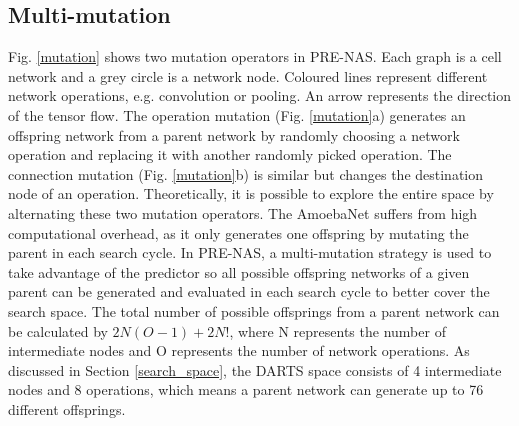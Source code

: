 \documentclass[sigconf]{acmart}
\begin{document}
\subsection{Multi-mutation}
\label{sec-mulmutation}
Fig. \ref{mutation} shows two mutation operators in PRE-NAS. Each graph is a cell network and a grey circle is a network node.  Coloured lines represent different network operations, e.g. convolution or pooling.  An arrow represents the direction of the tensor flow. The operation mutation (Fig. \ref{mutation}a) generates an offspring network from a parent network by randomly choosing a network operation and replacing it with another randomly picked operation.  The connection mutation (Fig. \ref{mutation}b) is similar but changes the destination node of an operation.  Theoretically, it is possible to explore the entire space by alternating these two mutation operators. 
The AmoebaNet \cite{Ref:08} suffers from high computational overhead, as it only generates one offspring by mutating the parent in each search cycle. In PRE-NAS, a multi-mutation strategy is used to take advantage of the predictor so all possible offspring networks of a given parent can be generated and evaluated in each search cycle to better cover the search space. The total number of possible offsprings from a parent network can be calculated by $2N(O-1)+2N!$, where N represents the number of intermediate nodes and O represents the number of network operations. As discussed in Section \ref{search_space}, the DARTS space consists of 4 intermediate nodes and 8 operations, which means a parent network can generate up to 76 different offsprings.
\end{document}
